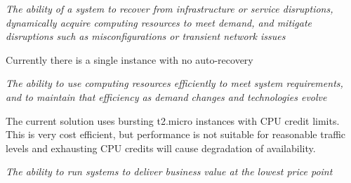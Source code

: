 
\textit{The ability of a system to recover from infrastructure or service disruptions, dynamically acquire computing resources to meet demand, and mitigate disruptions such as misconfigurations or transient network issues}

Currently there is a single instance with no auto-recovery




\textit{The ability to use computing resources efficiently
	to meet system requirements, and to maintain that efficiency as demand changes and technologies evolve}


The current solution uses bursting t2.micro instances with CPU credit limits. This is very cost efficient, but performance is not suitable for reasonable traffic levels and exhausting CPU credits will cause degradation of availability.


\textit{The ability to run systems to deliver business value at the lowest price point}





